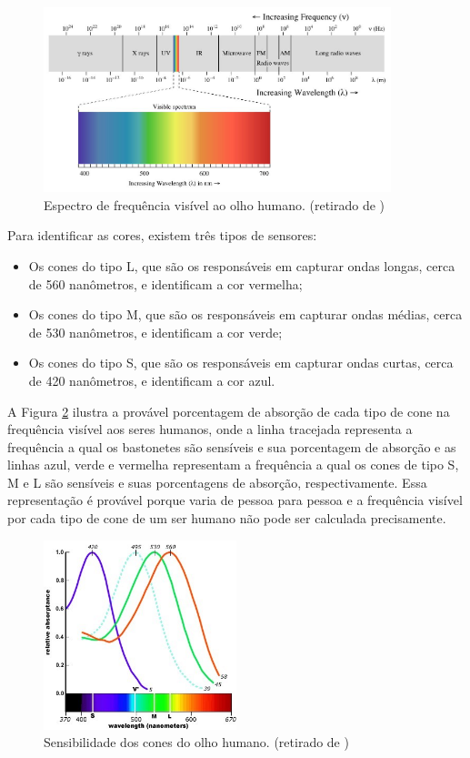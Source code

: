 \documentclass[	12pt, Times, openright, twoside, a4paper, english, brazil]{abntex2}
\begin{document}
\begin{figure}[!htb]
\centering
\includegraphics[width=0.9\textwidth]{figuraSpectro.jpg}
\caption{Espectro de frequência visível ao olho humano. (retirado de ) \label{fig:figuraSpectro}}
\end{figure}

Para identificar as cores, existem três tipos de sensores:

\begin{itemize}
\item Os cones do tipo L, que são os responsáveis em capturar ondas longas, cerca de 560 nanômetros, e identificam a cor vermelha;
\item Os cones do tipo M, que são os responsáveis em capturar ondas médias, cerca de 530 nanômetros, e identificam a cor verde;
\item Os cones do tipo S, que são os responsáveis em capturar ondas curtas, cerca de 420 nanômetros, e identificam a cor azul.
\end{itemize}

A Figura \ref{fig:figuraSensibilidadeCones} ilustra a provável porcentagem de absorção de cada tipo de cone na frequência visível aos seres humanos, onde a linha tracejada representa a frequência a qual os bastonetes são sensíveis e sua porcentagem de absorção e as linhas azul, verde e vermelha representam a frequência a qual os cones de tipo S, M e L são sensíveis e suas porcentagens de absorção, respectivamente. Essa representação é provável porque varia de pessoa para pessoa e a frequência visível por cada tipo de cone de um ser humano não pode ser calculada precisamente.

\begin{figure}[!htb]
\centering \includegraphics[width=0.5\textwidth]{figuraSensibilidadeCones.jpg}
\caption{Sensibilidade dos cones do olho humano. (retirado de ) \label{fig:figuraSensibilidadeCones}}
\end{figure}
\end{document}
